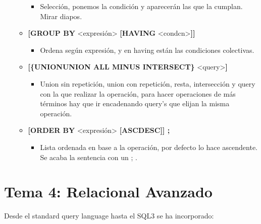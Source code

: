 \documentclass[12pt, twoside, openright]{report} %
\begin{document}
\begin{itemize}
\begin{itemize}
      \begin{itemize}
      \item Selección, ponemos la condición y aparecerán las que la cumplan.
        Mirar diapos.
        
      \end{itemize}
    \item \textbf{{[}GROUP BY} \textless expresión\textgreater{}
      \textbf{{[}HAVING} \textless condcn\textgreater{}\textbf{{]}{]}}
      

      \begin{itemize}
      \item Ordena según expresión, y en having están las condiciones
        colectivas.
        
      \end{itemize}
    \item \textbf{{[}\{UNION\textbar UNION ALL\textbar{} MINUS\textbar{}
      INTERSECT\}} \textless query\textgreater{}\textbf{{]}}
      

      \begin{itemize}
      \item Union sin repetición, union con repetición, resta, intersección
        y query con la que realizar la operación, para hacer operaciones
        de más términos hay que ir encadenando query's que elijan la
        misma operación.
        
      \end{itemize}
    \item \textbf{{[}ORDER BY} \textless expresión\textgreater{}
      \textbf{{[}ASC\textbar DESC{]}{]} ;}
      

      \begin{itemize}
      \item Lista ordenada en base a la operación, por defecto lo hace
        ascendente. Se acaba la sentencia con un ; .
        
      \end{itemize}
    \end{itemize}
  \end{itemize}

  
\chapter{Tema 4: Relacional Avanzado}



  
  Desde el standard query language hasta el SQL3 se ha incorporado:
  
\end{document}

